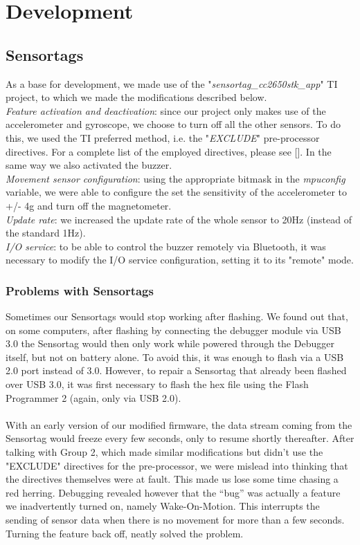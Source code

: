 \documentclass[conference,12pt]{IEEETran}
\begin{document}
\section{Development}
\subsection{Sensortags}
As a base for development, we made use of the "\textit{sensortag\_cc2650stk\_app}" TI project, to which we made the modifications described below.\\
\textit{Feature activation and deactivation}: since our project only makes use of the accelerometer and gyroscope, we choose to turn off all the other sensors. To do this, we used the TI preferred method, i.e. the "\textit{EXCLUDE}" pre-processor directives. For a complete list of the employed directives, please see []. In the same way we also activated the buzzer.\\
\textit{Movement sensor configuration}: using the appropriate bitmask in the \textit{mpuconfig} variable, we were able to configure the set the sensitivity of the accelerometer to +/- 4g and turn off the magnetometer.\\
\textit{Update rate}: we increased the update rate of the whole sensor to 20Hz (instead of the standard 1Hz).\\
\textit{I/O service}: to be able to control the buzzer remotely via Bluetooth, it was necessary to modify the I/O service configuration, setting it to its "remote" mode.

\subsubsection{Problems with Sensortags}
Sometimes our Sensortags would stop working after flashing. We found out that, on some computers, after flashing by connecting the debugger module via USB 3.0 the Sensortag would then only work while powered through the Debugger itself, but not on battery alone. To avoid this, it was enough to flash via a USB 2.0 port instead of 3.0. However, to repair a Sensortag  that already been flashed over USB 3.0, it was first necessary to flash the hex file using the Flash Programmer 2 (again, only via USB 2.0).\\\\
With an early version of our modified firmware, the data stream coming from the Sensortag would freeze every few seconds, only to resume shortly thereafter. After talking with Group 2, which made similar modifications but didn’t use the "EXCLUDE" directives for the pre-processor, we were mislead into thinking that the directives themselves were at fault. This made us lose some time chasing a red herring. Debugging revealed however that the “bug” was actually a feature we inadvertently turned on, namely  Wake-On-Motion. This interrupts the sending of sensor data when there is no movement for more than a few seconds. Turning the feature back off, neatly solved the problem.
\end{document}
